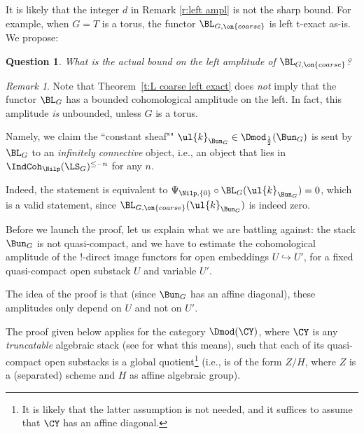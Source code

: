 \documentclass[9pt]{amsart}
\newtheorem{quest}[subsubsection]{Question}
\theoremstyle{remark}
\newtheorem{rem}[subsubsection]{Remark}
\theoremstyle{definition}
\theoremstyle{remark}
\newcommand{\thmref}[1]{Theorem~\ref{#1}}
\newcommand{\propref}[1]{Proposition~\ref{#1}}
\numberwithin{equation}{section}
\begin{document}
\sssec{}

It is likely that the integer $d$ in Remark \ref{r:left ampl} is not the sharp bound. 
For example, when $G=T$ is a torus, the functor $\BL_{G,\on{coarse}}$ is left t-exact as-is. We propose: 

\begin{quest}
What is the actual bound on the left amplitude of $\BL_{G,\on{coarse}}$?
\end{quest} 

\begin{rem} 
Note that \thmref{t:L coarse left exact} does \emph{not} imply that the functor $\BL_G$ has 
a bounded cohomological amplitude on the left. In fact, this amplitude \emph{is} unbounded,
unless $G$ is a torus. 

\medskip

Namely, we claim the ``constant sheaf"" $\ul{k}_{\Bun_G}\in \Dmod_{\frac{1}{2}}(\Bun_G)$ is sent by $\BL_G$ to an \emph{infinitely connective}
object, i.e., an object that lies in $\IndCoh_\Nilp(\LS_G)^{\leq -n}$ for any $n$. 

\medskip

Indeed, the statement is equivalent to
$\Psi_{\Nilp,\{0\}}\circ \BL_G(\ul{k}_{\Bun_G})=0$, which is a valid statement, since $\BL_{G,\on{coarse}}(\ul{k}_{\Bun_G})$ is indeed zero. 

\end{rem} 

\ssec{Proof of \propref{p:compact bdd below}}

Before we launch the proof, let us explain what we are battling against: the stack $\Bun_G$ is not quasi-compact, and we have
to estimate the cohomological amplitude of the !-direct image functors for open embeddings $U\hookrightarrow U'$,
for a fixed quasi-compact open substack $U$ and variable $U'$. 

\medskip

The idea of the proof is that (since $\Bun_G$ has an affine diagonal), 
these amplitudes only depend on $U$ and not on $U'$. 

\sssec{}

The proof given below applies for the category $\Dmod(\CY)$, where $\CY$ is any \emph{truncatable}
algebraic stack (see \cite[Sect. 0.2.3]{DG1} for what this means), such that each of its quasi-compact open substacks 
is a global quotient\footnote{It is likely that the latter assumption is not needed, and it suffices to assume that $\CY$ 
has an affine diagonal.} (i.e., is of the form $Z/H$, where $Z$ is a (separated) scheme and $H$ as affine algebraic group). 
\end{document}
